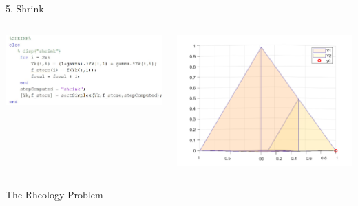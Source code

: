 \documentclass{beamer}
\begin{document}
\begin{frame}{5. Shrink}
	\begin{columns}
	\begin{column}{0.39\linewidth}
		\centering
		\includegraphics[width=0.95\linewidth]{Shrink}
	\end{column}
	\begin{column}{0.59\linewidth}
		\centering
		\includegraphics[width=0.95\linewidth]{ShrinkFig}
	\end{column}
	\end{columns}
\end{frame}





\begin{frame}{The Rheology Problem}

\end{frame}
\end{document}
